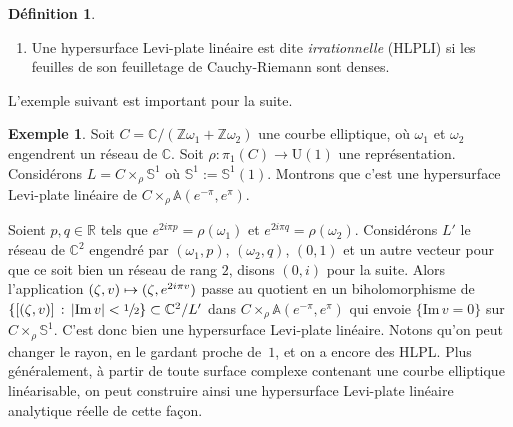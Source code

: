 \documentclass[JEP,XML,SOM,Unicode,francais,published]{cedram}
\newcommand\mto{\mathchoice{\longmapsto}{\mapsto}{\mapsto}{\mapsto}}
\newcommand{\Z}{\mathbb{Z}}
\newcommand{\R}{\mathbb{R}}
\newcommand{\C}{\mathbb{C}}
\newcommand{\rU}{\mathrm{U}}
\newcommand*\abs[1]{\left|#1\right|}
\theoremstyle{definition}
\newtheorem{exemple}[thm]{Exemple}
\newtheorem{defn}[thm]{Définition}
\begin{document}
\begin{defn}
\begin{enumerate}
De façon équivalente, $H$ peut être obtenu comme dans l'exemple précédent: $H$ est une HLPL s'il existe
\begin{enumerate}
\item un hyperplan réel $V$ de $\C^2$ ;
\item un réseau $L$ de rang 4 de $\C^2$ tel que $V$ soit rationnel par rapport à $L$ ;
\item un isomorphisme analytique réel $\phi\colon H \to H'$ où $H'$ est l'image de $V$ dans $\C^2/L$
\end{enumerate}tels que $\phi$ s'étend en une application biholomorphe d'un voisinage de $H$ dans un voisinage de $H'$. L'équivalence des définitions découle de l'analyticité réelle des objets considérés, qui permet en quelque sorte de reconstruire la structure complexe au voisinage de $H$. Remarquons de plus qu'on peut déformer l'hyperplan par des petites translations pour obtenir une infinité indénombrable d'autres HLPL dans le voisinage.
\item Une hypersurface Levi-plate linéaire est dite \emph{irrationnelle} (HLPLI) si les feuilles de son feuilletage de Cauchy-Riemann sont denses.
\end{enumerate}
\end{defn}

L'exemple suivant est important pour la suite.
\begin{exemple}
\label{hlpl-elliptique}
Soit $C = \C/(\Z\omega_1 + \Z\omega_2)$ une courbe elliptique, où $\omega_1$ et $\omega_2$ engen\-drent un réseau de $\C$. Soit $\rho \colon \pi_1(C) \to \rU(1)$ une représentation. Considérons $L = C \times_\rho \mathbb{S}^1$ où $\mathbb{S}^1:= \mathbb{S}^1(1)$. Montrons que c'est une hypersurface Levi-plate linéaire de \hbox{$C \times_\rho \mathbb{A}(e^{-\pi}, e^{\pi})$}.

Soient $p, q \in \R$ tels que $e^{2i\pi p} = \rho(\omega_1)$ et $e^{2i\pi q} = \rho(\omega_2)$. Considérons $L'$ le réseau de $\C^2$ engendré par $(\omega_1, p)$, $(\omega_2, q)$, $(0, 1)$ et un autre vecteur pour que ce soit bien un réseau de rang $2$, disons $(0, i)$ pour la suite.
Alors l'application $(\zeta, v) \mto (\zeta, e^{2i\pi v})$ passe au quotient en un biholomorphisme de $\{[(\zeta, v)]\,:\,\abs{\mathrm{Im}\,v} < \sfrac{1}{2}\}\subset\C^2/L'$ dans $C \times_\rho \mathbb{A}(e^{-\pi}, e^{\pi})$ qui envoie $\{\mathrm{Im}\,v = 0\}$ sur $C\times_\rho \mathbb{S}^1$. C'est donc bien une hypersurface Levi-plate linéaire. Notons qu'on peut changer le rayon, en le gardant proche de~$1$, et on a encore des HLPL. Plus généralement, à partir de toute surface complexe contenant une courbe elliptique linéarisable, on peut construire ainsi une hypersurface Levi-plate linéaire analytique réelle de cette façon.
\end{exemple}
\end{document}

